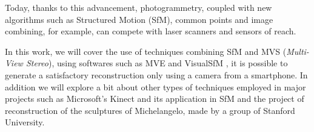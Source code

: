 \documentclass[a4paper,12pt,oneside,onecolumn,final,fleqn]{repUERJ}
\theoremstyle{plain}
\theoremstyle{definition}
\begin{document}
Today, thanks to this advancement, photogrammetry, coupled with new algorithms such as Structured Motion (SfM), common points and image combining, for example, can compete with laser scanners and sensors of reach. 

In this work, we will cover the use of techniques combining SfM and MVS (\emph{Multi-View Stereo}), using softwares such as MVE \cite{mve} and VisualSfM \cite{wu2011visualsfm}, it is possible to generate a satisfactory reconstruction only using a camera from a smartphone. In addition we will explore a bit about other types of techniques employed in major projects such as Microsoft's Kinect and its application in SfM and the project of reconstruction of the sculptures of Michelangelo, made by a group of Stanford University. 



\printkeys


\listadefiguras







\end{document}
